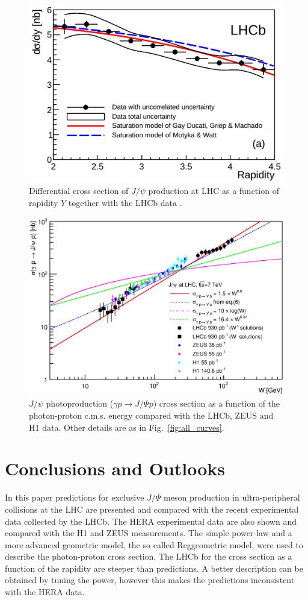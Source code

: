 \documentclass[12pt]{article}
\begin{document}
\begin{figure}[p]
\centering
 \includegraphics[width=.8\textwidth]{figures/Magno.png}
 \caption{Differential cross section of $J/\psi$ production at LHC as a function of rapidity $Y$ together with the LHCb data \cite{LHCb2}.}
 \label{fig:dipole}
\end{figure}

\clearpage

\begin{figure}[!t]
\centering
 \includegraphics[width=.8\textwidth]{figures/sigma_gamma_p_W_all_theory.eps}
 \caption{$J/\psi$ photoproduction ($\gamma p \to J/\Psi p$) cross section as a function of the photon-proton c.m.s. energy compared
           with the LHCb, ZEUS and H1 data. Other details are as in Fig.~\ref{fig:all_curves}.}
 \label{fig:all_curves_w}
\end{figure}

\section{Conclusions and Outlooks}

In this paper predictions for exclusive $J/\Psi$ meson production in ultra-peripheral collisions at the LHC are presented and compared with the recent experimental data collected by the LHCb.
The HERA  experimental data are also shown and compared with the H1 and ZEUS measurements.
The simple power-law and a more advanced geometric model, the so called Reggeometric model, were used to describe the photon-proton cross section.
The LHCb for the cross section as a function of the rapidity are steeper than predictions. A better description can be obtained by tuning the power,
however this makes the predictions inconsistent with the HERA data. 
\end{document}
